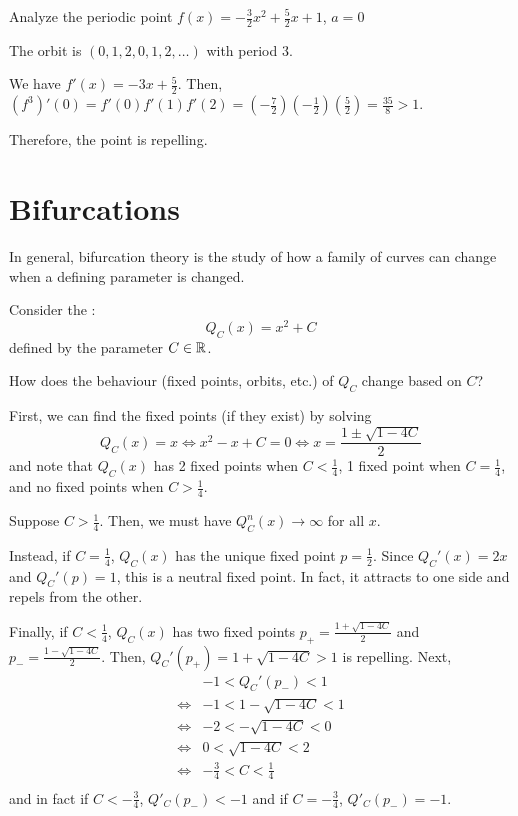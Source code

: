 \documentclass[class=pmath370,tikz,notes]{agony}
\begin{document}
\begin{example}
  Analyze the periodic point $f(x) = -\frac32x^2+\frac52x+1$, $a=0$
\end{example}
\begin{sol}
  The orbit is $(0,1,2,0,1,2,\dotsc)$ with period 3.

  We have $f'(x) = -3x + \frac52$.
  Then, $(f^3)'(0) = f'(0)f'(1)f'(2) = (-\frac72)(-\frac12)(\frac52) = \frac{35}{8} > 1$.

  Therefore, the point is repelling.
\end{sol}

\chapter{Bifurcations}

In general, bifurcation theory is the study of how a family of curves
can change when a defining parameter is changed.

Consider the :
\[ Q_C(x) = x^2 + C \]
defined by the parameter $C \in \mathbb{R}$.

\begin{problem}
  How does the behaviour (fixed points, orbits, etc.) of $Q_C$ change based on $C$?
\end{problem}

First, we can find the fixed points (if they exist) by solving
\[ Q_C(x) = x \iff x^2 - x + C = 0 \iff x = \frac{1\pm\sqrt{1-4C}}{2} \]
and note that $Q_C(x)$ has 2 fixed points when $C < \frac14$,
1 fixed point when $C = \frac14$, and
no fixed points when $C > \frac14$.

Suppose $C > \frac14$.
Then, we must have $Q_C^n(x) \to \infty$ for all $x$.

Instead, if $C = \frac14$, $Q_C(x)$ has the unique fixed point $p=\frac12$.
Since $Q_C'(x) = 2x$ and $Q_C'(p) = 1$, this is a neutral fixed point.
In fact, it attracts to one side and repels from the other.

Finally, if $C < \frac14$, $Q_C(x)$ has two fixed points
$p_+ = \frac{1+\sqrt{1-4C}}{2}$ and $p_- = \frac{1-\sqrt{1-4C}}{2}$.
Then, $Q_C'(p_+) = 1+\sqrt{1-4C} > 1$ is repelling.
Next,
\begin{align*}
       & -1 < Q_C'(p_-) < 1     \\
  \iff & -1 < 1-\sqrt{1-4C} < 1 \\
  \iff & -2 < -\sqrt{1-4C} < 0  \\
  \iff & 0 < \sqrt{1-4C} < 2    \\
  \iff & -\frac34 < C < \frac14 \\
\end{align*}
and in fact if $C < -\frac34$, $Q'_C(p_-) < -1$
and if $C = -\frac34$, $Q'_C(p_-) = -1$.
\end{document}
